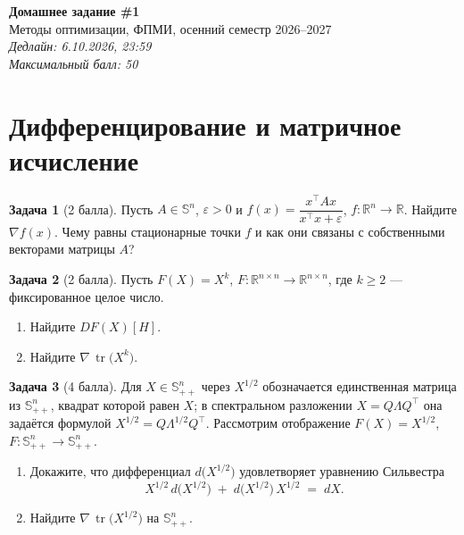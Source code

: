 \documentclass[11pt]{article}
\theoremstyle{definition}
\newtheorem{problem}{Задача}
\theoremstyle{remark}
\DeclareMathOperator{\tr}{tr}
\newcommand{\R}{\mathbb{R}}
\newcommand{\Sym}{\mathbb{S}}
\begin{document}
\begin{center}
{\Large\bfseries Домашнее задание \#1}\\[3pt]
{\normalsize Методы оптимизации, ФПМИ, осенний семестр 2026--2027}\\[6pt]
{\normalsize\itshape Дедлайн: 6.10.2026, 23:59}\\[3pt]
{\normalsize\itshape Максимальный балл: 50}
\end{center}

\vspace{0.3cm}

\section{Дифференцирование и матричное исчисление}

\begin{problem}[2 балла]
Пусть $A \in \Sym^{n}$, $\varepsilon > 0$ и $f(x) = \dfrac{x^{\top} A x}{x^{\top} x + \varepsilon}$,
$f \colon \R^{n} \to \R$. Найдите $\nabla f(x)$. Чему равны стационарные точки $f$ и как они связаны с собственными векторами
матрицы $A$?
\end{problem}

\begin{problem}[2 балла]
Пусть $F(X) = X^{k}$, $F \colon \R^{n \times n} \to \R^{n \times n}$, где $k \ge 2$ ---
фиксированное целое число.
\begin{enumerate}[label=(\alph*), nosep]
  \item Найдите $D F(X)[H]$.
  \item Найдите $\nabla\, \tr\bigl(X^{k}\bigr)$.%
\end{enumerate}
\end{problem}

\begin{problem}[4 балла]
Для $X \in \Sym^{n}_{++}$ через $X^{1/2}$ обозначается единственная матрица из $\Sym^{n}_{++}$, квадрат которой равен $X$; в спектральном разложении $X = Q \Lambda Q^{\top}$ она задаётся формулой $X^{1/2} = Q \Lambda^{1/2} Q^{\top}$. Рассмотрим отображение $F(X) = X^{1/2}$, $F \colon \Sym^{n}_{++} \to \Sym^{n}_{++}$.
\begin{enumerate}[label=(\alph*), nosep]
  \item Докажите, что дифференциал $d\bigl(X^{1/2}\bigr)$ удовлетворяет уравнению Сильвестра
        \[
        X^{1/2}\, d\bigl(X^{1/2}\bigr) \;+\; d\bigl(X^{1/2}\bigr)\, X^{1/2} \;=\; dX .
        \]
  \item Найдите $\nabla\, \tr\bigl(X^{1/2}\bigr)$ на $\Sym^{n}_{++}$.
\end{enumerate}
\end{problem}
\end{document}
